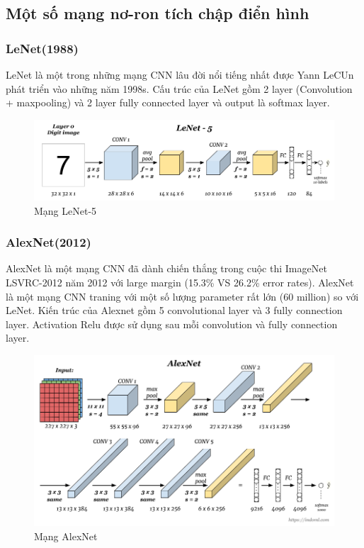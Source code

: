 \subsection{Một số mạng nơ-ron tích chập điển hình}
\subsubsection{LeNet(1988)}
LeNet là một trong những mạng CNN lâu đời nổi tiếng nhất được Yann LeCUn phát triển vào những năm 1998s. Cấu trúc của LeNet gồm 2 layer (Convolution + maxpooling) và 2 layer fully connected layer và output là softmax layer. 
\begin{figure}[H]
	\begin{center}
		\includegraphics[scale=0.4]{chap3/image/cnn/lenet-52.png}
	\end{center}
	\caption{Mạng LeNet-5}
	\label{fig:CNN}
\end{figure}
\subsubsection{AlexNet(2012)}
AlexNet là một mạng CNN đã dành chiến thắng trong cuộc thi ImageNet LSVRC-2012 năm 2012 với large margin (15.3\% VS 26.2\% error rates). AlexNet là một mạng CNN traning với một số lượng parameter rất lớn (60 million) so với LeNet. Kiến trúc của Alexnet gồm 5 convolutional layer và 3 fully connection layer. Activation Relu được sử dụng sau mỗi convolution và fully connection layer.
\begin{figure}[H]
	\begin{center}
		\includegraphics[scale=0.4]{chap3/image/cnn/alexnet.png}
	\end{center}
	\caption{Mạng AlexNet}
	\label{fig:CNN}
\end{figure}
